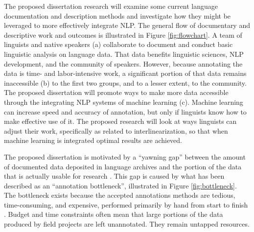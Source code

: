 The proposed dissertation research will examine some current language documentation and description methods and investigate how they might be leveraged to more effectively integrate NLP. The general flow of documentary and descriptive work and outcomes is illustrated in Figure \ref{fig:flowchart}. A team of linguists and native speakers (a) collaborate to document and conduct basic linguistic analysis on language data. That data benefits linguistic sciences, NLP development, and the community of speakers. However, because annotating the data is time- and labor-intensive work, a significant portion of that data remains inaccessible (b) to the first two groups, and to a lesser extent, to the community. The proposed dissertation will promote ways to make more data accessible through the integrating NLP systems of machine learning (c). Machine learning can increase %
speed and accuracy of annotation, but only if linguists know how to make effective use of it. The proposed research 
will look at ways linguists can adjust their work, specifically as related to interlinearization, so that when machine learning is integrated optimal results are achieved. 

The proposed dissertation is motivated by a “yawning gap” between the amount of documented data deposited in language archives and the portion of the data that is actually usable for research \citep{seifart_language_2018}. This gap is caused by what has been described as an ``annotation bottleneck'', illustrated in Figure \ref{fig:bottleneck}. The bottleneck exists because the accepted annotations methods are tedious, time-consuming, and expensive, performed primarily by hand from start to finish \citep{simons_worlds_2013,holton_developing_2017}.
Budget and time constraints often mean that large portions of the data produced by field projects are left unannotated. They remain untapped resources. 

